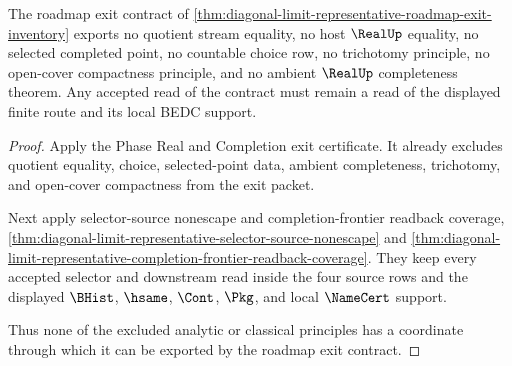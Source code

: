 \begin{theorem}
\label{thm:diagonal-limit-representative-roadmap-exit-nonescape}
The roadmap exit contract of \autoref{thm:diagonal-limit-representative-roadmap-exit-inventory} exports no quotient stream equality, no host $\RealUp$ equality, no selected completed point, no countable choice row, no trichotomy principle, no open-cover compactness principle, and no ambient $\RealUp$ completeness theorem. Any accepted read of the contract must remain a read of the displayed finite route and its local BEDC support.
\end{theorem}
\begin{proof}
Apply the Phase Real and Completion exit certificate. It already excludes quotient equality, choice, selected-point data, ambient completeness, trichotomy, and open-cover compactness from the exit packet.

Next apply selector-source nonescape and completion-frontier readback coverage, \autoref{thm:diagonal-limit-representative-selector-source-nonescape} and \autoref{thm:diagonal-limit-representative-completion-frontier-readback-coverage}. They keep every accepted selector and downstream read inside the four source rows and the displayed $\BHist$, $\hsame$, $\Cont$, $\Pkg$, and local $\NameCert$ support.

Thus none of the excluded analytic or classical principles has a coordinate through which it can be exported by the roadmap exit contract.
\end{proof}

